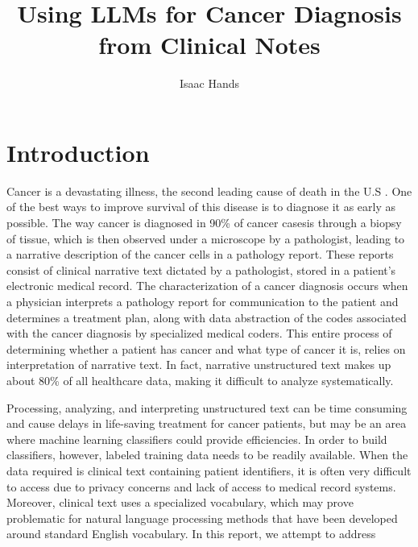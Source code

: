 \documentclass[manuscript,screen,review,nonacm]{acmart}
\begin{document}
\title{Using LLMs for Cancer Diagnosis from Clinical Notes}

\author{Isaac Hands}

\maketitle

\section{Introduction}
Cancer is a devastating illness, the second leading cause of death in the U.S \cite{cdc1}. One of the best ways to improve survival of this disease is to diagnose it as early as possible\cite{cruk1}. The way cancer is diagnosed in 90\% of cancer cases\cite{cdc2}is through a biopsy of tissue, which is then observed under a microscope by a pathologist, leading to a narrative description of the cancer cells in a pathology report. These reports consist of clinical narrative text dictated by a pathologist, stored in a patient's electronic medical record. The characterization of a cancer diagnosis occurs when a physician interprets a pathology report for communication to the patient and determines a treatment plan, along with data abstraction of the codes associated with the cancer diagnosis by specialized medical coders. This entire process of determining whether a patient has cancer and what type of cancer it is, relies on interpretation of narrative text. In fact, narrative unstructured text makes up about 80\% of all healthcare data\cite{Kong:2019tl}, making it difficult to analyze systematically. 

	Processing, analyzing, and interpreting unstructured text can be time consuming and cause delays in life-saving treatment for cancer patients, but may be an area where machine learning classifiers could provide efficiencies. In order to build classifiers, however, labeled training data needs to be readily available. When the data required is clinical text containing patient identifiers, it is often very difficult to access due to privacy concerns and lack of access to medical record systems. Moreover, clinical text uses a specialized vocabulary, which may prove problematic for natural language processing methods that have been developed around standard English vocabulary. In this report, we attempt to address
\end{document}
